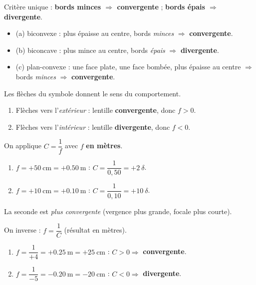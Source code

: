 \documentclass[11pt,a4paper]{article}
\begin{document}

\begin{corrige}
Critère unique : \textbf{bords minces $\Rightarrow$ convergente} ; \textbf{bords épais $\Rightarrow$
divergente}.
\begin{itemize}[label=--,leftmargin=1.4em,topsep=2pt,itemsep=1pt]
  \item (a) biconvexe : plus épaisse au centre, bords \emph{minces} $\Rightarrow$
        \textcolor{excol}{\textbf{convergente}}.
  \item (b) biconcave : plus mince au centre, bords \emph{épais} $\Rightarrow$
        \textcolor{attncol}{\textbf{divergente}}.
  \item (c) plan-convexe : une face plate, une face bombée, plus épaisse au centre $\Rightarrow$
        bords \emph{minces} $\Rightarrow$ \textcolor{excol}{\textbf{convergente}}.
\end{itemize}
\end{corrige}

\begin{corrige}
Les flèches du symbole donnent le sens du comportement.
\begin{enumerate}[label=\alph*)]
  \item Flèches vers l'\emph{extérieur} : lentille \textbf{convergente}, donc $f>0$.
  \item Flèches vers l'\emph{intérieur} : lentille \textbf{divergente}, donc $f<0$.
\end{enumerate}
\end{corrige}

\begin{corrige}
On applique $C=\dfrac{1}{f}$ avec $f$ \textbf{en mètres}.
\begin{enumerate}[label=\alph*)]
  \item $f=+\qty{50}{\cm}=+\qty{0.50}{\m}$ : $C=\dfrac{1}{0,50}=+2~\delta$.
  \item $f=+\qty{10}{\cm}=+\qty{0.10}{\m}$ : $C=\dfrac{1}{0,10}=+10~\delta$.
\end{enumerate}
La seconde est \emph{plus convergente} (vergence plus grande, focale plus courte).
\end{corrige}

\begin{corrige}
On inverse : $f=\dfrac{1}{C}$ (résultat en mètres).
\begin{enumerate}[label=\alph*)]
  \item $f=\dfrac{1}{+4}=+\qty{0.25}{\m}=+\qty{25}{\cm}$ : $C>0\Rightarrow$ \textbf{convergente}.
  \item $f=\dfrac{1}{-5}=-\qty{0.20}{\m}=-\qty{20}{\cm}$ : $C<0\Rightarrow$ \textbf{divergente}.
\end{enumerate}
\end{corrige}
\end{document}
